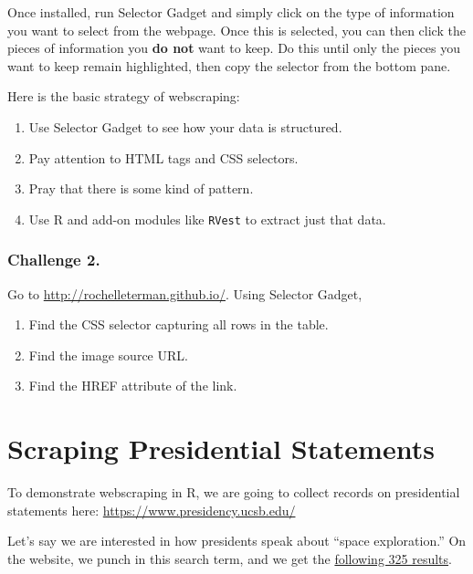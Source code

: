 \documentclass[
]{book}
\providecommand{\tightlist}{%
  \setlength{\itemsep}{0pt}\setlength{\parskip}{0pt}}
\begin{document}
Once installed, run Selector Gadget and simply click on the type of information you want to select from the webpage. Once this is selected, you can then click the pieces of information you \textbf{do not} want to keep. Do this until only the pieces you want to keep remain highlighted, then copy the selector from the bottom pane.

Here is the basic strategy of webscraping:

\begin{enumerate}
\def\labelenumi{\arabic{enumi}.}
\tightlist
\item
  Use Selector Gadget to see how your data is structured.
\item
  Pay attention to HTML tags and CSS selectors.
\item
  Pray that there is some kind of pattern.
\item
  Use R and add-on modules like \texttt{RVest} to extract just that data.
\end{enumerate}

\hypertarget{challenge-2.-14}{%
\subsubsection*{Challenge 2.}\label{challenge-2.-14}}

Go to \url{http://rochelleterman.github.io/}. Using Selector Gadget,

\begin{enumerate}
\def\labelenumi{\arabic{enumi}.}
\tightlist
\item
  Find the CSS selector capturing all rows in the table.
\item
  Find the image source URL.
\item
  Find the HREF attribute of the link.
\end{enumerate}

\hypertarget{scraping-presidential-statements}{%
\section{Scraping Presidential Statements}\label{scraping-presidential-statements}}

To demonstrate webscraping in R, we are going to collect records on presidential statements here: \url{https://www.presidency.ucsb.edu/}

Let's say we are interested in how presidents speak about ``space exploration.'' On the website, we punch in this search term, and we get the \href{https://www.presidency.ucsb.edu/advanced-search?field-keywords=\%22space+exploration\%22\&field-keywords2=\&field-keywords3=\&from\%5Bdate\%5D=\&to\%5Bdate\%5D=\&person2=\&items_per_page=100}{following 325 results}.
\end{document}
